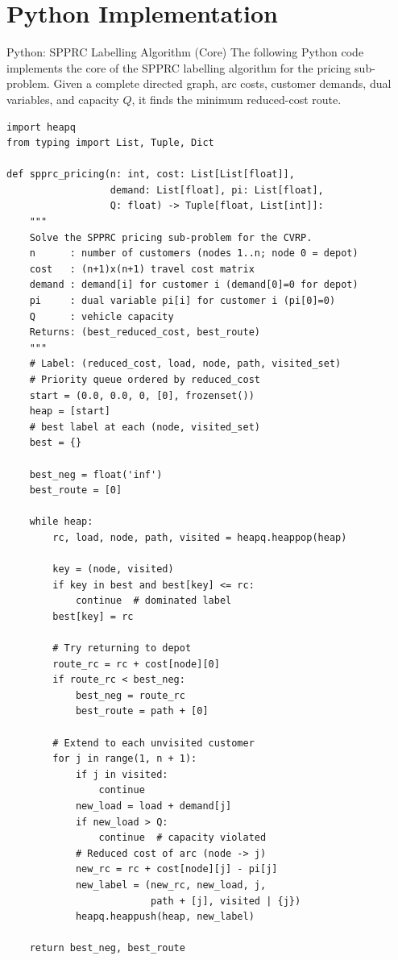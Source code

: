 \documentclass[aspectratio=169,10pt]{beamer}
\begin{document}
\appendix
\section{Python Implementation}

\begin{frame}[fragile]{Python: SPPRC Labelling Algorithm (Core)}
The following Python code implements the core of the SPPRC labelling
algorithm for the pricing sub-problem. Given a complete directed graph,
arc costs, customer demands, dual variables, and capacity $Q$, it finds
the minimum reduced-cost route.

\begin{lstlisting}[caption={SPPRC labelling algorithm for CVRP pricing}]
import heapq
from typing import List, Tuple, Dict

def spprc_pricing(n: int, cost: List[List[float]],
                  demand: List[float], pi: List[float],
                  Q: float) -> Tuple[float, List[int]]:
    """
    Solve the SPPRC pricing sub-problem for the CVRP.
    n      : number of customers (nodes 1..n; node 0 = depot)
    cost   : (n+1)x(n+1) travel cost matrix
    demand : demand[i] for customer i (demand[0]=0 for depot)
    pi     : dual variable pi[i] for customer i (pi[0]=0)
    Q      : vehicle capacity
    Returns: (best_reduced_cost, best_route)
    """
    # Label: (reduced_cost, load, node, path, visited_set)
    # Priority queue ordered by reduced_cost
    start = (0.0, 0.0, 0, [0], frozenset())
    heap = [start]
    # best label at each (node, visited_set)
    best = {}

    best_neg = float('inf')
    best_route = [0]

    while heap:
        rc, load, node, path, visited = heapq.heappop(heap)

        key = (node, visited)
        if key in best and best[key] <= rc:
            continue  # dominated label
        best[key] = rc

        # Try returning to depot
        route_rc = rc + cost[node][0]
        if route_rc < best_neg:
            best_neg = route_rc
            best_route = path + [0]

        # Extend to each unvisited customer
        for j in range(1, n + 1):
            if j in visited:
                continue
            new_load = load + demand[j]
            if new_load > Q:
                continue  # capacity violated
            # Reduced cost of arc (node -> j)
            new_rc = rc + cost[node][j] - pi[j]
            new_label = (new_rc, new_load, j,
                         path + [j], visited | {j})
            heapq.heappush(heap, new_label)

    return best_neg, best_route
\end{lstlisting}
\end{frame}
\end{document}
